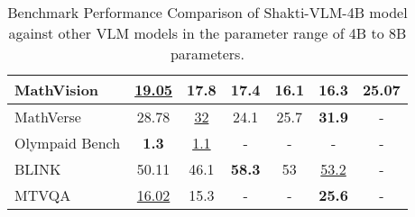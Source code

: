 \documentclass{article}
\begin{document}
\begin{table}
{\begin{tabular}{|l|c|c|c|c|c|c|}
\hline
MathVision & \underline{19.05} & 17.8 & 17.4 & 16.1 & 16.3 & \textbf{25.07} \\
\hline
MathVerse & 28.78 & \underline{32} & 24.1 & 25.7 & \textbf{31.9} & - \\
\hline
Olympaid Bench & \textbf{1.3} & \underline{1.1} & - & - & - & - \\
\hline
BLINK & 50.11 & 46.1 & \textbf{58.3} & 53 &\underline{53.2} & - \\
\hline
MTVQA & \underline{16.02} & 15.3 & - & - & \textbf{25.6} & - \\
\hline
\end{tabular}%
}
\caption{Benchmark Performance Comparison of Shakti-VLM-4B model against other VLM models in the parameter range of 4B to 8B parameters.}
\label{table:benchmark-shakti-VLM-4B}
\end{table}
\end{document}
